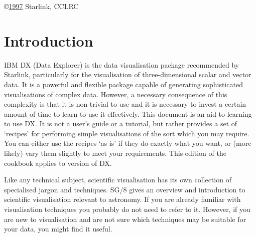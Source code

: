 \vspace{2.5cm}
\copyright \underline{1997} Starlink, CCLRC

\cleardoublepage
\renewcommand{\thepage}{\arabic{page}}
\setcounter{page}{1}

\section{Introduction}

IBM DX (Data Explorer) is the data visualisation package recommended by
Starlink, particularly for the visualisation of three-dimensional
scalar and vector data. It is a powerful and flexible package capable
of generating sophisticated visualisations of complex data. However, a
necessary consequence of this complexity is that it is non-trivial to
use and it is necessary to invest a certain amount of time to learn to
use it effectively. This document is an aid to learning to use DX. It
is not a user's guide or a tutorial, but rather provides a set of
`recipes' for performing simple visualisations of the sort which
you may require. You can either use the recipes `as is' if they do
exactly what you want, or (more likely) vary them slightly to meet
your requirements. This edition of the cookbook applies to version
\DXversion of DX.

Like any technical subject, scientific visualisation has its own
collection of specialised jargon and techniques. SG/8 \cite{SG8}
gives an overview and introduction to scientific visualisation relevant
to astronomy. If you are already familiar with visualisation techniques
you probably do not need to refer to it. However, if you are new to
visualisation and are not sure which techniques may be suitable for your
data, you might find it useful.


